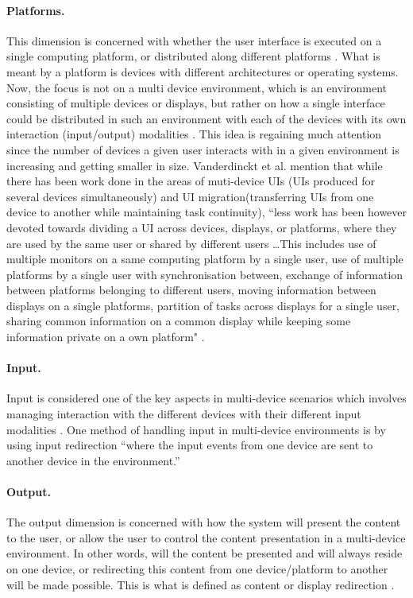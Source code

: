 \paragraph{Platforms.} This dimension is concerned with whether the user
interface is executed on a single computing platform, or distributed along
different platforms \cite{elmqvist2011distributed}. What is meant by a
platform is devices with different architectures or operating systems.
Now, the focus is not on a multi device environment, which is an environment
consisting of multiple devices or displays, but rather on how a single interface
could be distributed in such an environment with each of the devices with its
own interaction (input/output) modalities \cite{elmqvist2011distributed}. This
idea is regaining much attention since the number of devices a given user
interacts with in a given environment is increasing and getting smaller in
size.
Vanderdinckt et al. mention that while there has been work done in the areas of
muti-device UIs (UIs produced for several devices simultaneously) and UI
migration(transferring UIs from one device to another while maintaining task
continuity), ``less work has been however devoted towards
dividing a UI across devices, displays, or platforms, where they are used by the
same user or shared by different users \ldots This includes use of
multiple monitors on a same computing platform by a single user, use of
multiple platforms by a single user with synchronisation between, exchange of
information between platforms belonging to different users, moving information
between displays on a single platforms, partition of tasks across displays for a
single user, sharing common information on a common display while keeping some
information private on a own platform" \cite{vanderdonckt2010distributed}.

\paragraph{Input.} Input is considered one of the key aspects in
multi-device scenarios which involves managing interaction with the different
devices with their different input modalities \cite{elmqvist2011distributed}.
One method of handling input in multi-device environments is by using input
redirection ``where the input events from one device are sent to another device
in the environment.''\cite{elmqvist2011distributed}

\paragraph{Output.} The output dimension is concerned with how the system will
present the content to the user, or allow the user to control the content
presentation in a multi-device environment. In other words, will the content be
presented and will always reside on one device, or
redirecting this content from one device/platform to another will be made
possible. This is what is defined as content or display redirection
\cite{elmqvist2011distributed}.

